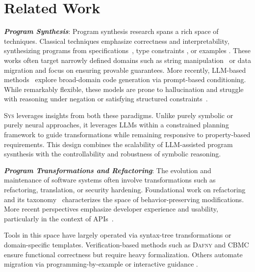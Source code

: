 \documentclass[sigplan]{acmart}
\newcommand{\sys}{{\scshape Sys}\xspace}
\newcommand{\heading}[1]{\vspace{2pt}\noindent\textbf{\emph{#1}}:\enspace}
\begin{document}
\section{Related Work}

\heading{Program Synthesis}
Program synthesis research spans a rich space of techniques.
Classical techniques emphasize correctness and
interpretability, synthesizing programs from specifications~\cite{alur2013syntax, feser2015synthesizing, gulwani2011automating},
type constraints \cite{polikarpova2016program},
or examples \cite{jha2010oracle, raza2018disjunctive, singh2016blinkfill}.
These works often target narrowly
defined domains such as string manipulation~\cite{harp:ccs:2021} or data migration
\cite{yaghmazadeh2018automated} and focus on ensuring provable guarantees.
More recently, LLM-based methods~\cite{austin2021program, chen2021evaluating}
explore broad-domain code generation via prompt-based conditioning.
While remarkably flexible, these models are prone to hallucination and struggle
with reasoning under negation or satisfying structured constraints~\cite{xu2023llmfoolitselfpromptbased, wu2023deceptpromptexploitingllmdrivencode,jiang2024llmsdreamelephantswhen,hwang2024thinkpinkelephant}.

\sys leverages insights from both these paradigms.
Unlike purely symbolic or purely neural approaches, it leverages LLMs within a
constrained planning framework to guide transformations while remaining
responsive to property-based requirements.
This design combines
the scalability of LLM-assisted program sysnthesis with the controllability and robustness of symbolic
reasoning. %

\heading{Program Transformations and Refactoring}
The evolution and maintenance of software systems often involve transformations
such as refactoring, translation, or security hardening. Foundational work on
refactoring~\cite{Fowler99} and its taxonomy~\cite{Mens04} characterizes the
space of behavior-preserving modifications. More recent perspectives emphasize
developer experience and usability, particularly in the context of APIs~\cite{Myers16}.

Tools in this space have largely operated via syntax-tree transformations or
domain-specific templates. Verification-based methods such as \textsc{Dafny}
\cite{Leino10} and \textsc{CBMC} \cite{Clarke04} ensure functional correctness
but require heavy formalization.
Others automate migration via
programming-by-example or interactive guidance \cite{gulwani2017program, le2017interactive}.
\end{document}
